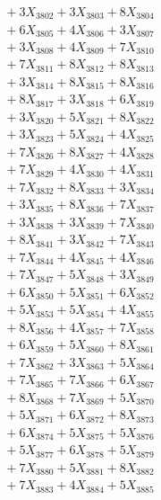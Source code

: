 \documentclass[a4paper,10pt]{article}
\begin{document}
{\begin{align}
&\;  + 3 X_{3802} + 3 X_{3803} + 8 X_{3804} \\[0.3ex]
&\;  + 6 X_{3805} + 4 X_{3806} + 3 X_{3807} \\[0.3ex]
&\;  + 3 X_{3808} + 4 X_{3809} + 7 X_{3810} \\[0.3ex]
&\;  + 7 X_{3811} + 8 X_{3812} + 8 X_{3813} \\[0.3ex]
&\;  + 3 X_{3814} + 8 X_{3815} + 8 X_{3816} \\[0.3ex]
&\;  + 8 X_{3817} + 3 X_{3818} + 6 X_{3819} \\[0.5ex]\allowbreak
&\;  + 3 X_{3820} + 5 X_{3821} + 8 X_{3822} \\[0.3ex]
&\;  + 3 X_{3823} + 5 X_{3824} + 4 X_{3825} \\[0.3ex]
&\;  + 7 X_{3826} + 8 X_{3827} + 4 X_{3828} \\[0.3ex]
&\;  + 7 X_{3829} + 4 X_{3830} + 4 X_{3831} \\[0.3ex]
&\;  + 7 X_{3832} + 8 X_{3833} + 3 X_{3834} \\[0.3ex]
&\;  + 3 X_{3835} + 8 X_{3836} + 7 X_{3837} \\[0.3ex]
&\;  + 3 X_{3838} + 3 X_{3839} + 7 X_{3840} \\[0.3ex]
&\;  + 8 X_{3841} + 3 X_{3842} + 7 X_{3843} \\[0.3ex]
&\;  + 7 X_{3844} + 4 X_{3845} + 4 X_{3846} \\[0.3ex]
&\;  + 7 X_{3847} + 5 X_{3848} + 3 X_{3849} \\[0.5ex]\allowbreak
&\;  + 6 X_{3850} + 5 X_{3851} + 6 X_{3852} \\[0.3ex]
&\;  + 5 X_{3853} + 5 X_{3854} + 4 X_{3855} \\[0.3ex]
&\;  + 8 X_{3856} + 4 X_{3857} + 7 X_{3858} \\[0.3ex]
&\;  + 6 X_{3859} + 5 X_{3860} + 8 X_{3861} \\[0.3ex]
&\;  + 7 X_{3862} + 3 X_{3863} + 5 X_{3864} \\[0.3ex]
&\;  + 7 X_{3865} + 7 X_{3866} + 6 X_{3867} \\[0.3ex]
&\;  + 8 X_{3868} + 7 X_{3869} + 5 X_{3870} \\[0.3ex]
&\;  + 5 X_{3871} + 6 X_{3872} + 8 X_{3873} \\[0.3ex]
&\;  + 6 X_{3874} + 5 X_{3875} + 5 X_{3876} \\[0.3ex]
&\;  + 5 X_{3877} + 6 X_{3878} + 5 X_{3879} \\[0.5ex]\allowbreak
&\;  + 7 X_{3880} + 5 X_{3881} + 8 X_{3882} \\[0.3ex]
&\;  + 7 X_{3883} + 4 X_{3884} + 5 X_{3885} \\[0.3ex]

\end{align}}
\end{document}
